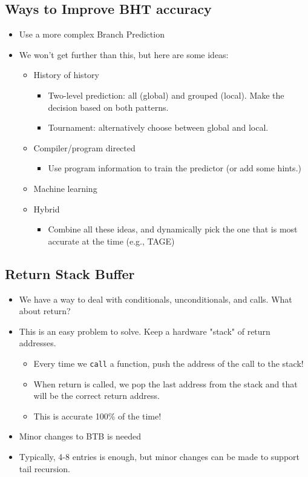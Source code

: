\documentclass[10pt]{article}
\begin{document}
\subsection*{Ways to Improve BHT accuracy}
\begin{itemize}
    \item Use a more complex Branch Prediction
    \item We won't get further than this, but here are some ideas:
    \begin{itemize}
        \item History of history
        \begin{itemize}
            \item Two-level prediction: all (global) and grouped (local).  Make the decision based on both patterns.
            \item Tournament: alternatively choose between global and local.
        \end{itemize}
        \item Compiler/program directed
        \begin{itemize}
            \item Use program information to train the predictor (or add some hints.)
        \end{itemize}
        \item Machine learning
        \item Hybrid
        \begin{itemize}
            \item Combine all these ideas, and dynamically pick the one that is most accurate at the time (e.g., TAGE)
        \end{itemize}
    \end{itemize}
\end{itemize}

\subsection*{Return Stack Buffer}
\begin{itemize}
    \item We have a way to deal with conditionals, unconditionals, and calls.  What about return?
    \item This is an easy problem to solve.  Keep a hardware "stack" of return addresses.
    \begin{itemize}
        \item Every time we \texttt{call} a function, push the address of the call to the stack!
        \item When return is called, we pop the last address from the stack and that will be the correct return address.
        \item This is accurate 100\% of the time!
    \end{itemize}
    \item Minor changes to BTB is needed
    \item Typically, 4-8 entries is enough, but minor changes can be made to support tail recursion.
\end{itemize}
\end{document}
